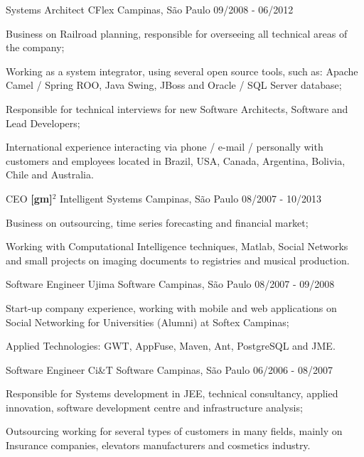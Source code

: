 \begin{cventries}
\cventry
{Systems Architect}
{CFlex}
{Campinas, São Paulo}
{09/2008 - 06/2012}
{
\begin{cvitems}
\item Business on Railroad planning, responsible for overseeing all technical areas of the company;
\item Working as a system integrator, using several open source tools, such as: Apache Camel / Spring ROO, Java Swing, JBoss and Oracle / SQL Server database;
\item Responsible for technical interviews for new Software Architects, Software and Lead Developers;
\item International experience interacting via phone / e-mail / personally with customers and employees located in Brazil, USA, Canada, Argentina, Bolivia, Chile and Australia.
\end{cvitems}
}

\cventry
{CEO}
{\textbf{[gm]}$^2$ Intelligent Systems}
{Campinas, São Paulo}
{08/2007 - 10/2013}
{
\begin{cvitems}
\item Business on outsourcing, time series forecasting and financial market;
\item Working with Computational Intelligence techniques, Matlab, Social Networks and small projects on imaging documents to registries and musical production.
\end{cvitems}
}

\cventry
{Software Engineer}
{Ujima Software}
{Campinas, São Paulo}
{08/2007 - 09/2008}
{
\begin{cvitems}
\item Start-up company experience, working with mobile and web applications on Social Networking for Universities (Alumni) at Softex Campinas;
\item Applied Technologies: GWT, AppFuse, Maven, Ant, PostgreSQL and JME.
\end{cvitems}
}

\cventry
{Software Engineer}
{Ci\&T Software}
{Campinas, São Paulo}
{06/2006 - 08/2007}
{
\begin{cvitems}
\item Responsible for Systems development in JEE, technical consultancy, applied innovation, software development centre and infrastructure analysis;
\item Outsourcing working for several types of customers in many fields, mainly on Insurance companies, elevators manufacturers and cosmetics industry.
\end{cvitems}
}


\end{cventries}
